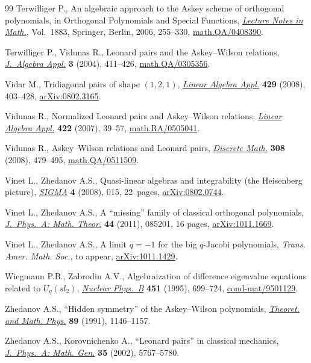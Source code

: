 \documentclass[pdftex]{sigma}
\numberwithin{equation}{section}
\begin{document}
\begin{thebibliography}{99}
 Terwilliger P.,
An algebraic approach to the Askey scheme of orthogonal polynomials,
in Orthogonal Polynomials and Special Functions,
\href{http://dx.doi.org/10.1007/978-3-540-36716-1_6}{{\it  Lecture Notes in Math.}}, Vol.~1883, Springer, Berlin, 2006, 255--330,
\href{http://arxiv.org/abs/math.QA/0408390}{math.QA/0408390}.



Terwilliger P., Vidunas R.,
Leonard pairs and the Askey--Wilson relations,
\href{http://dx.doi.org/10.1142/S0219498804000940}{{\it J.~Algebra Appl.}} {\bf 3} (2004), 411--426,
\href{http://arxiv.org/abs/math.QA/0305356}{math.QA/0305356}.

Vidar M.,
Tridiagonal pairs of shape $(1,2,1)$,
\href{http://dx.doi.org/10.1016/j.laa.2008.02.034}{{\it Linear Algebra Appl.}} {\bf 429} (2008), 403--428,
\href{http://arxiv.org/abs/0802.3165}{arXiv:0802.3165}.


Vidunas R.,
Normalized Leonard pairs and Askey--Wilson relations,
\href{http://dx.doi.org/10.1016/j.laa.2005.12.033}{{\it Linear Algebra Appl.}} {\bf 422} (2007), 39--57,
\href{http://arxiv.org/abs/math.RA/0505041}{math.RA/0505041}.

Vidunas R.,
Askey--Wilson relations and Leonard pairs,
\href{http://dx.doi.org/10.1016/j.disc.2007.03.037}{{\it Discrete Math.}} {\bf 308} (2008), 479--495,
\href{http://arxiv.org/abs/math.QA/0511509}{math.QA/0511509}.

Vinet L., Zhedanov A.S.,
Quasi-linear algebras and integrability (the Heisenberg picture),
\href{http://dx.doi.org/10.3842/SIGMA.2008.015}{{\it SIGMA}}  {\bf 4} (2008),  015, 22~pages,
\href{http://arxiv.org/abs/0802.0744}{arXiv:0802.0744}.

Vinet L., Zhedanov A.S.,
    A ``missing'' family of classical orthogonal polynomials,
\href{http://dx.doi.org/10.1088/1751-8113/44/8/085201}{{\it J.~Phys.~A: Math. Theor.}} {\bf 44} (2011), 085201, 16 pages,
\href{http://arxiv.org/abs/1011.1669}{arXiv:1011.1669}.


Vinet L., Zhedanov A.S.,
    A limit $q=-1$ for the big $q$-Jacobi polynomials,
{\it Trans. Amer. Math. Soc.}, to appear,
\href{http://arxiv.org/abs/1011.1429}{arXiv:1011.1429}.

Wiegmann P.B.,  Zabrodin A.V.,
Algebraization of dif\/ference eigenvalue equations related to $U_q(sl_2)$,
\href{http://dx.doi.org/10.1016/0550-3213(95)00361-U}{{\it Nuclear Phys.~B}} {\bf 451} (1995), 699--724,
\href{http://arxiv.org/abs/cond-mat/9501129}{cond-mat/9501129}.

Zhedanov A.S.,
``Hidden symmetry'' of the Askey--Wilson polynomials,
\href{http://dx.doi.org/10.1007/BF01015906}{{\it Theoret. and Math. Phys.}} {\bf 89} (1991), 1146--1157.


Zhedanov A.S., Korovnichenko A.,
``Leonard pairs'' in classical mechanics,
\href{http://dx.doi.org/10.1088/0305-4470/35/27/316}{{\it J.~Phys.~A: Math. Gen.}} {\bf 35} (2002), 5767--5780.

\end{thebibliography}\LastPageEnding
\end{document}
